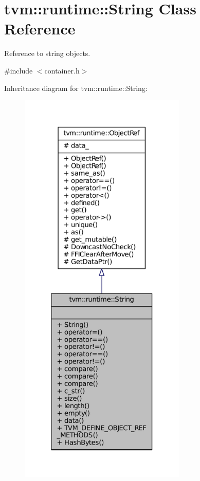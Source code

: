 \hypertarget{classtvm_1_1runtime_1_1String}{}\section{tvm\+:\+:runtime\+:\+:String Class Reference}
\label{classtvm_1_1runtime_1_1String}


Reference to string objects.  




{\ttfamily \#include $<$container.\+h$>$}



Inheritance diagram for tvm\+:\+:runtime\+:\+:String\+:
\nopagebreak
\begin{figure}[H]
\begin{center}
\leavevmode
\includegraphics[height=550pt]{classtvm_1_1runtime_1_1String__inherit__graph}
\end{center}
\end{figure}


